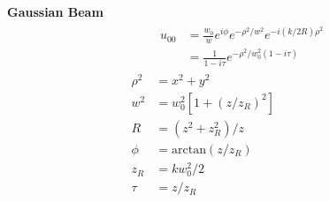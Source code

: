 \documentclass[12pt]{article}
\begin{document}
\begin{multicols}{2}
\textbf{Gaussian Beam}
\begin{align}
  &\begin{aligned}
    u_{00} &=\frac{w_0}{w}e^{i\phi}e^{-\rho^2/w^2}e^{-i(k/2R)\rho^2}\\
    &= \frac{1}{1 - i\tau} e^{-\rho^2 / w_0^2(1 - i\tau)}
   \end{aligned}\\
  \rho^2 &= x^2 + y^2\\
  w^2 &= w_0^2[1+{(z/z_R)}^2]\\
  R &= (z^2 + z_R^2) / z\\
  \phi &= \textrm{arctan}(z/z_R)\\
  z_R &= k w_0^2 / 2\\
  \tau &= z / z_R
\end{align}



\end{multicols}
\end{document}
